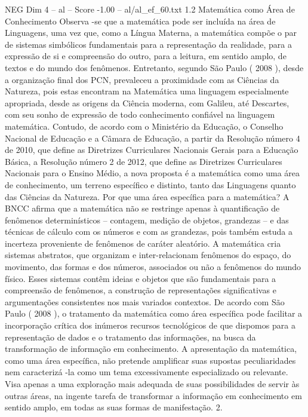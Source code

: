 \begin{textsample}{NEG Dim 4 – al – Score -1.00 – al/al\_ef\_60.txt}  \label{ex:f4_neg_250}
1.2 Matemática como Área de Conhecimento Observa -se que a matemática pode ser incluída na área de Linguagens, uma vez que, como a Língua Materna, a matemática compõe o par de sistemas simbólicos fundamentais para a representação da realidade, para a expressão de si e compreensão do outro, para a leitura, em sentido amplo, de textos e do mundo dos fenômenos.
Entretanto, segundo São Paulo ( 2008 ), desde a organização final dos PCN, prevaleceu a proximidade com as Ciências da Natureza, pois estas encontram na Matemática uma linguagem especialmente apropriada, desde as origens da Ciência moderna, com Galileu, até Descartes, com seu sonho de expressão de todo conhecimento confiável na linguagem matemática.
Contudo, de acordo com o Ministério da Educação, o Conselho Nacional de Educação e a Câmara de Educação, a partir da Resolução número 4 de 2010, que define as Diretrizes Curriculares Nacionais Gerais para a Educação Básica, a Resolução número 2 de 2012, que define as Diretrizes Curriculares Nacionais para o Ensino Médio, a nova proposta é a matemática como uma área de conhecimento, um terreno específico e distinto, tanto das Linguagens quanto das Ciências da Natureza.
Por que uma área específica para a matemática?
A BNCC afirma que a matemática não se restringe apenas à quantificação de fenômenos determinísticos – contagem, medição de objetos, grandezas – e das técnicas de cálculo com os números e com as grandezas, pois também estuda a incerteza proveniente de fenômenos de caráter aleatório.
A matemática cria sistemas abstratos, que organizam e inter-relacionam fenômenos do espaço, do movimento, das formas e dos números, associados ou não a fenômenos do mundo físico.
Esses sistemas contêm ideias e objetos que são fundamentais para a compreensão de fenômenos, a construção de representações significativas e argumentações consistentes nos mais variados contextos.
De acordo com São Paulo ( 2008 ), o tratamento da matemática como área específica pode facilitar a incorporação crítica dos inúmeros recursos tecnológicos de que dispomos para a representação de dados e o tratamento das informações, na busca da transformação de informação em conhecimento.
A apresentação da matemática, como uma área específica, não pretende amplificar suas supostas peculiaridades nem caracterizá -la como um tema excessivamente especializado ou relevante.
Visa apenas a uma exploração mais adequada de suas possibilidades de servir às outras áreas, na ingente tarefa de transformar a informação em conhecimento em sentido amplo, em todas as suas formas de manifestação. 2.

\end{textsample}
